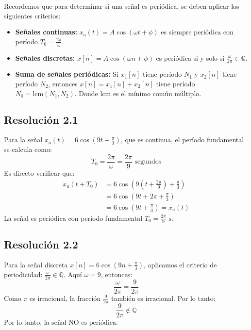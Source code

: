 \documentclass[
  11pt,
  letterpaper,
   addpoints,
   answers
  ]{exam}
\begin{document}
\begin{questions}
\begin{solution}

Recordemos que para determinar si una señal es periódica, se deben aplicar los siguientes criterios:

\begin{itemize}
\item \textbf{Señales continuas:} $x_a(t) = A\cos(\omega t + \phi)$ es siempre periódica con período $T_0 = \frac{2\pi}{\omega}$.
\item \textbf{Señales discretas:} $x[n] = A\cos(\omega n + \phi)$ es periódica si y solo si $\frac{\omega}{2\pi} \in \mathbb{Q}$.
\item \textbf{Suma de señales periódicas:} Si $x_1[n]$ tiene período $N_1$ y $x_2[n]$ tiene período $N_2$, entonces $x[n] = x_1[n] + x_2[n]$ tiene período $N_0 = \text{lcm}(N_1, N_2)$. Donde $\text{lcm}$ es el mínimo común múltiplo.
\end{itemize}
\subsection*{Resolución 2.1}

Para la señal $x_a(t) = 6\cos\!\left(9t+\tfrac{\pi}{3}\right)$, que es continua, el período fundamental se calcula como:
\begin{equation}
T_0 = \frac{2\pi}{\omega} = \frac{2\pi}{9} \text{ segundos}
\end{equation}
Es directo verificar que:
\begin{align}
x_a(t + T_0) &= 6\cos\!\left(9\left(t + \frac{2\pi}{9}\right) + \frac{\pi}{3}\right) \\
&= 6\cos\!\left(9t + 2\pi + \frac{\pi}{3}\right) \\
&= 6\cos\!\left(9t + \frac{\pi}{3}\right) = x_a(t)
\end{align}
La señal es periódica con período fundamental $\boxed{T_0 = \frac{2\pi}{9} \text{ s}}$.

\subsection*{Resolución 2.2}

Para la señal discreta $x[n] = 6\cos\!\left(9n+\tfrac{\pi}{3}\right)$, aplicamos el criterio de periodicidad: $\frac{\omega}{2\pi} \in \mathbb{Q}$. Aquí $\omega = 9$, entonces:
\begin{equation}
\frac{\omega}{2\pi} = \frac{9}{2\pi}
\end{equation}
Como $\pi$ es irracional, la fracción $\frac{9}{2\pi}$ también es irracional. Por lo tanto:
\begin{equation}
\frac{9}{2\pi} \notin \mathbb{Q}
\end{equation}
Por lo tanto, la señal $\boxed{\text{NO es periódica}}$.

\end{solution}
\end{questions}
\end{document}

